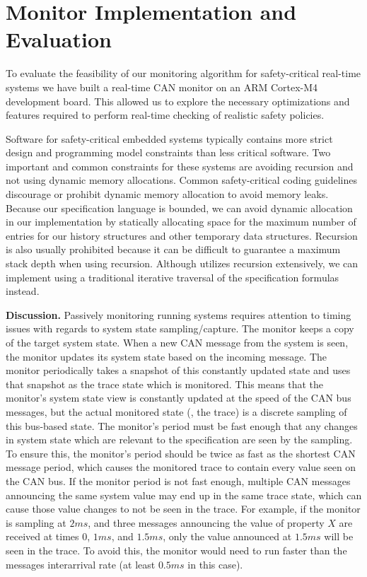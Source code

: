 
\section{Monitor Implementation and Evaluation}
\label{sec:implementation}

To evaluate the feasibility of our monitoring algorithm for safety-critical
real-time systems we have built a real-time CAN monitor on an ARM Cortex-M4
development board. This allowed us to explore the necessary optimizations and
features required to perform real-time checking of realistic safety policies.


Software for safety-critical embedded systems typically contains more strict
design and programming model constraints than less critical software. Two
important and common constraints for these systems are avoiding recursion and
not using dynamic memory allocations.
Common safety-critical coding guidelines discourage or prohibit dynamic memory
allocation to avoid memory leaks.
Because our specification language is bounded, we can avoid dynamic allocation
in our \monitor implementation by statically allocating space for the maximum
number of entries for our history structures and other temporary data structures.
Recursion is also usually prohibited because it can be difficult to guarantee a
maximum stack depth when using recursion. Although \monitor utilizes recursion
extensively, we can implement \monitor using a traditional iterative traversal
of the specification formulas instead.

\noindent\textbf{Discussion. }
Passively monitoring running systems requires attention to timing issues with regards to system state sampling/capture.
%
The monitor keeps a copy of the target system state. When a new CAN message from the system is seen, the monitor updates its system state based on the incoming message. The monitor periodically takes a snapshot of this constantly updated state and uses that snapshot as the trace state which is monitored.
%
This means that the monitor's system state view is constantly updated at the speed of the CAN bus messages, but the actual monitored state (\ie, the trace) is a discrete sampling of this bus-based state.
The monitor's period must be fast enough that any changes in system state which are relevant to the specification are seen by the sampling.
To ensure this, the monitor's period should be twice as fast as the shortest CAN message period, which causes the monitored trace to contain every value seen on the CAN bus.
If the monitor period is not fast enough, multiple CAN messages announcing the same system value may end up in the same trace state, which can cause those value changes to not be seen in the trace.
For example, if the monitor is sampling at $2ms$, and three messages announcing the value of property $X$ are received at times $0$, $1ms$, and $1.5ms$, only the value announced at $1.5ms$ will be seen in the trace. To avoid this, the monitor would need to run faster than the messages interarrival rate (at least $0.5ms$ in this case).

